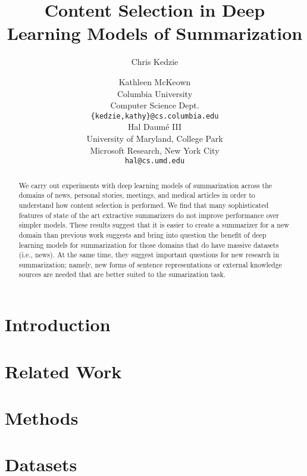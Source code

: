 \documentclass[11pt,a4paper]{article}
\title{Content Selection in Deep Learning Models of Summarization}
\author{Chris Kedzie \and Kathleen McKeown\\
  Columbia University \\
  Computer Science Dept. \\
  {\tt \{kedzie,kathy\}@cs.columbia.edu} \\\And
  Hal Daum\'e III  \\
  University of Maryland, College Park \\
  Microsoft Research, New York City \\
  {\tt hal@cs.umd.edu} \\}
\date{}
\begin{document}
\maketitle
\begin{abstract}
We carry out experiments with deep learning models of summarization across the domains of news, personal stories, meetings, and medical articles in order to understand how content selection is performed. We find that many sophisticated features of state of the art extractive summarizers do not improve performance over simpler models. These results suggest that it is easier to create a summarizer for  a new domain than previous work suggests and bring into question the benefit of deep learning models for summarization for those domains that do have massive datasets (i.e., news). At the same time, they suggest important questions for new research in summarization; namely,  new forms of sentence representations or external knowledge sources are needed that are better suited to the sumarization task. 
\end{abstract}



\section{Introduction}


\section{Related Work} \label{sec:related}


\section{Methods}


%



\section{Datasets}
\label{sec:datasets}




\end{document}
